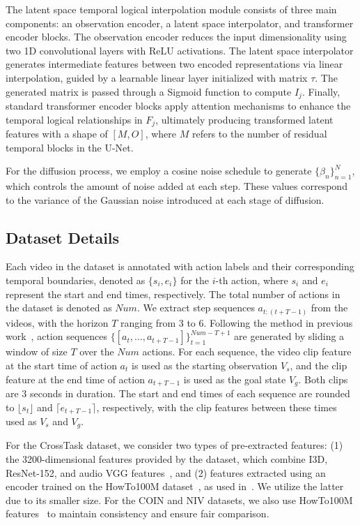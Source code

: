 The latent space temporal logical interpolation module consists of three main components: an observation encoder, a latent space interpolator, and transformer encoder blocks. The observation encoder reduces the input dimensionality using two 1D convolutional layers with ReLU activations. The latent space interpolator generates intermediate features between two encoded representations via linear interpolation, guided by a learnable linear layer initialized with matrix $\tau$. The generated matrix is passed through a Sigmoid function to compute $I_j$. Finally, standard transformer encoder blocks apply attention mechanisms to enhance the temporal logical relationships in $F_j$, ultimately producing transformed latent features with a shape of $[M, O]$, where $M$ refers to the number of residual temporal blocks in the U-Net.


For the diffusion process, we employ a cosine noise schedule to generate $\{\beta_n\}_{n=1}^N$, which controls the amount of noise added at each step. These values correspond to the variance of the Gaussian noise introduced at each stage of diffusion.


\subsection{Dataset Details} 
Each video in the dataset is annotated with action labels and their corresponding temporal boundaries, denoted as $\{s_i, e_i\}$ for the $i$-th action, where $s_i$ and $e_i$ represent the start and end times, respectively. The total number of actions in the dataset is denoted as $Num$. We extract step sequences $a_{t:(t+T-1)}$ from the videos, with the horizon $T$ ranging from 3 to 6. Following the method in previous work~\citep{wang2023pdpp}, action sequences $\{[a_t, \ldots, a_{t+T-1}]\}_{t=1}^{Num-T+1}$ are generated by sliding a window of size $T$ over the $Num$ actions. For each sequence, the video clip feature at the start time of action $a_t$ is used as the starting observation $V_s$, and the clip feature at the end time of action $a_{t+T-1}$ is used as the goal state $V_g$. Both clips are 3 seconds in duration. The start and end times of each sequence are rounded to $\lfloor s_t \rfloor$ and $\lceil e_{t+T-1} \rceil$, respectively, with the clip features between these times used as $V_s$ and $V_g$.

For the CrossTask dataset, we consider two types of pre-extracted features: (1) the 3200-dimensional features provided by the dataset, which combine I3D, ResNet-152, and audio VGG features~\citep{carreira2017quo,he2016deep,hershey2017cnn}, and (2) features extracted using an encoder trained on the HowTo100M dataset~\citep{miech2019howto100m}, as used in~\citep{wang2023pdpp}. We utilize the latter due to its smaller size. For the COIN and NIV datasets, we also use HowTo100M features~\citep{wang2023pdpp} to maintain consistency and ensure fair comparison.



